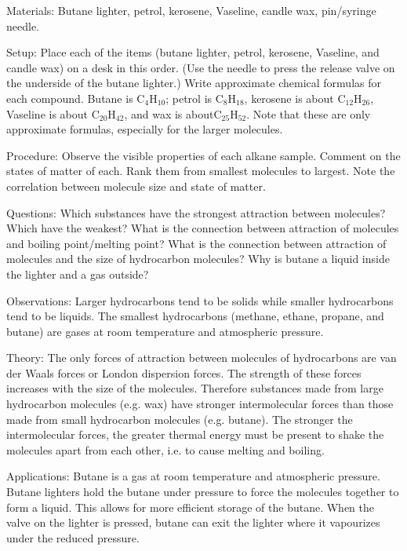 \begin{multicols}{2}
\begin{description*}
\item[Materials:]{Butane lighter, petrol, kerosene, Vaseline, candle wax, pin/syringe needle.}
\item[Setup:]{Place each of the items (butane lighter, petrol, kerosene, Vaseline, and candle wax) on a desk in this order. (Use the needle to press the release valve on the underside of the butane lighter.) Write approximate chemical formulas for each compound. Butane is \ce C$_4$H$_{10}$; petrol is \ce C$_8$H$_{18}$, kerosene is about \ce C$_{12}$H$_{26}$, Vaseline is about \ce C$_{20}$H$_{42}$, and wax is about\ce C$_{25}$H$_{52}$. Note that these are only approximate formulas, especially for the larger molecules.}
\item[Procedure:]{Observe the visible properties of each alkane sample. Comment on the states of matter of each. Rank them from smallest molecules to largest. Note the correlation between molecule size and state of matter.}
\item[Questions:]{Which substances have the strongest attraction between molecules? Which have the weakest? What is the connection between attraction of molecules and boiling point/melting point? What is the connection between attraction of molecules and the size of hydrocarbon molecules? Why is butane a liquid inside the lighter and a gas outside?}
\item[Observations:]{Larger hydrocarbons tend to be solids while smaller hydrocarbons tend to be liquids. The smallest hydrocarbons (methane, ethane, propane, and butane) are gases at room temperature and atmospheric pressure.}
\item[Theory:]{The only forces of attraction between molecules of hydrocarbons are van der Waals forces or London dispersion forces. The strength of these forces increases with the size of the molecules. Therefore substances made from large hydrocarbon molecules (e.g. wax) have stronger intermolecular forces than those made from small hydrocarbon molecules (e.g. butane). The stronger the intermolecular forces, the greater thermal energy must be present to shake the molecules apart from each other, i.e. to cause melting and boiling.}
\item[Applications:]{Butane is a gas at room temperature and atmospheric pressure. Butane lighters hold the butane under pressure to force the molecules together to form a liquid. This allows for more efficient storage of the butane. When the valve on the lighter is pressed, butane can exit the lighter where it vapourizes under the reduced pressure.}
\end{description*}


\end{multicols}
